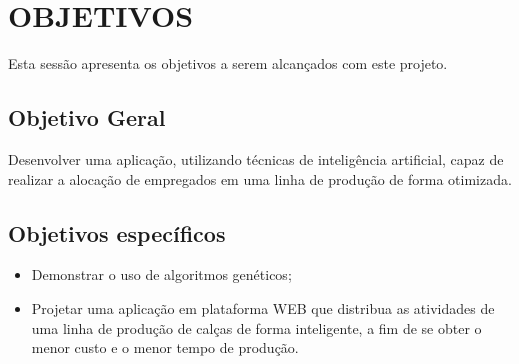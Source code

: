 \chapter{OBJETIVOS}

\par Esta sessão apresenta os objetivos a serem alcançados com este projeto.

\section{Objetivo Geral}

  Desenvolver uma aplicação, utilizando técnicas de inteligência artificial,
  capaz de  realizar a alocação de empregados em uma linha de produção de forma
  otimizada.
  

\section{Objetivos específicos}
  
 \begin{itemize}

	\item Demonstrar o uso de algoritmos genéticos;
	  
	\item Projetar uma aplicação em plataforma WEB que distribua as atividades de
	uma linha de produção de calças de forma inteligente, a fim de se obter o
	menor custo e o menor tempo de produção.
	
 \end{itemize}
  